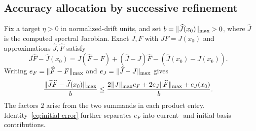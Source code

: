 \subsection{Accuracy allocation by successive refinement}\label{sec:budget}
Fix a target $\eta>0$ in normalized-drift units, and set
$b=\lVert\widehat J(x_0)\rVert_{\max}>0$, where $\widehat J$ is the computed spectral
Jacobian. Exact $J,F$ with $JF=J(x_0)$ and approximations
$\widehat J,\widehat F$ satisfy
\begin{equation}\label{eq:budget-identity}
 \widehat J\widehat F-\widehat J(x_0)
 =J(\widehat F-F)+(\widehat J-J)\widehat F
   -(\widehat J(x_0)-J(x_0)).
\end{equation}
Writing $e_F=\lVert\widehat F-F\rVert_{\max}$ and $e_J=\lVert\widehat J-J\rVert_{\max}$ gives
\begin{equation}\label{eq:budget-bound}
 \frac{\lVert\widehat J\widehat F-\widehat J(x_0)\rVert_{\max}}{b}
 \le\frac{2\lVert J\rVert_{\max} e_F+2e_J\lVert\widehat F\rVert_{\max}+e_J(x_0)}{b}.
\end{equation}
The factors $2$ arise from the two summands in each product entry.
Identity~\eqref{eq:initial-error} further separates $e_F$ into current-
and initial-basis contributions.

